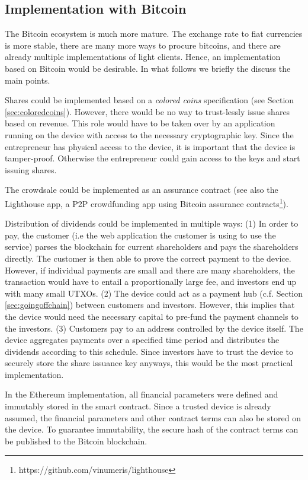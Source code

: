 \subsection{Implementation with Bitcoin}

The Bitcoin ecosystem is much more mature. The exchange rate to fiat currencies is more stable, there are many more ways to procure bitcoins, and there are already multiple implementations of light clients. Hence, an implementation based on Bitcoin would be desirable. In what follows we briefly the discuss the main points.

Shares could be implemented based on a \emph{colored coins} specification (see Section \ref{sec:coloredcoins}). However, there would be no way to trust-lessly issue shares based on revenue. This role would have to be taken over by an application running on the device with access to the necessary cryptographic key. Since the entrepreneur has physical access to the device, it is important that the device is tamper-proof. Otherwise the entrepreneur could gain access to the keys and start issuing shares.

The crowdsale could be implemented as an assurance contract \parencite{smartcontr} (see also the Lighthouse app, a \ac{P2P} crowdfunding app using Bitcoin assurance contracts\footnote{https://github.com/vinumeris/lighthouse}).

 Distribution of dividends could be implemented in multiple ways: (1) In order to pay, the customer (i.e the web application the customer is using to use the service) parses the blockchain for current shareholders and pays the shareholders directly. The customer is then able to  prove the correct payment to the device. However, if individual payments are small and there are many shareholders, the transaction would have to entail a proportionally large fee, and investors end up with many small \ac{UTXO}s. (2) The device could act as a payment hub (c.f. Section \ref{sec:goingoffchain}) between customers and investors. However, this implies that the device would need the necessary capital to pre-fund the payment channels to the investors. (3) Customers pay to an address controlled by the device itself. The device aggregates payments over a specified time period and distributes the dividends according to this schedule. Since investors have to trust the device to securely store the share issuance key anyways, this would be the most practical implementation. 

In the Ethereum implementation, all financial parameters were defined and immutably stored in the smart contract. Since a trusted device is already assumed, the financial parameters and other contract terms can also be stored on the device. To guarantee immutability, the secure hash of the contract terms can be published to the Bitcoin blockchain. 

